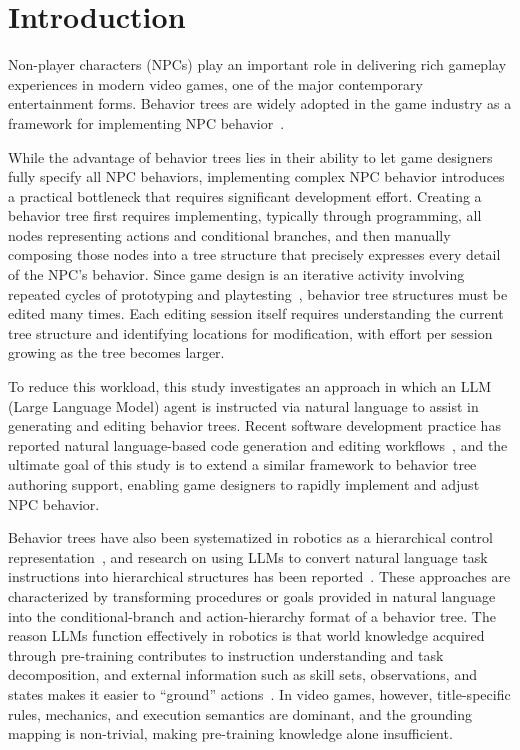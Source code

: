 \documentclass[conference]{IEEEtran}
\begin{document}
\section{Introduction}

Non-player characters (NPCs) play an important role in delivering rich gameplay experiences in modern video games, one of the major contemporary entertainment forms. Behavior trees are widely adopted in the game industry as a framework for implementing NPC behavior~\cite{rabin2013game}.

While the advantage of behavior trees lies in their ability to let game designers fully specify all NPC behaviors, implementing complex NPC behavior introduces a practical bottleneck that requires significant development effort. Creating a behavior tree first requires implementing, typically through programming, all nodes representing actions and conditional branches, and then manually composing those nodes into a tree structure that precisely expresses every detail of the NPC's behavior. Since game design is an iterative activity involving repeated cycles of prototyping and playtesting~\cite{gamedesign_iterative}, behavior tree structures must be edited many times. Each editing session itself requires understanding the current tree structure and identifying locations for modification, with effort per session growing as the tree becomes larger.

To reduce this workload, this study investigates an approach in which an LLM (Large Language Model) agent is instructed via natural language to assist in generating and editing behavior trees. Recent software development practice has reported natural language-based code generation and editing workflows~\cite{vibecoding_practice}, and the ultimate goal of this study is to extend a similar framework to behavior tree authoring support, enabling game designers to rapidly implement and adjust NPC behavior.

Behavior trees have also been systematized in robotics as a hierarchical control representation~\cite{bt_survey}, and research on using LLMs to convert natural language task instructions into hierarchical structures has been reported~\cite{Izzo2024-wv,Ao2025-gl}. These approaches are characterized by transforming procedures or goals provided in natural language into the conditional-branch and action-hierarchy format of a behavior tree. The reason LLMs function effectively in robotics is that world knowledge acquired through pre-training contributes to instruction understanding and task decomposition, and external information such as skill sets, observations, and states makes it easier to ``ground'' actions~\cite{Ichter2023-jf}. In video games, however, title-specific rules, mechanics, and execution semantics are dominant, and the grounding mapping is non-trivial, making pre-training knowledge alone insufficient.
\end{document}
